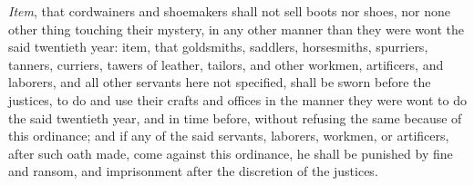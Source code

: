 \documentclass[
  letterpaper,
  11pt,
  DIV=9,
  openright]{scrbook}
\begin{document}

\emph{Item}, that cordwainers and shoemakers shall not sell boots nor
shoes, nor none other thing touching their mystery, in any other manner
than they were wont the said twentieth year: item, that goldsmiths,
saddlers, horsesmiths, spurriers, tanners, curriers, tawers of leather,
tailors, and other workmen, artificers, and laborers, and all other
servants here not specified, shall be sworn before the justices, to do
and use their crafts and offices in the manner they were wont to do the
said twentieth year, and in time before, without refusing the same
because of this ordinance; and if any of the said servants, laborers,
workmen, or artificers, after such oath made, come against this
ordinance, he shall be punished by fine and ransom, and imprisonment
after the discretion of the justices.

\end{document}
